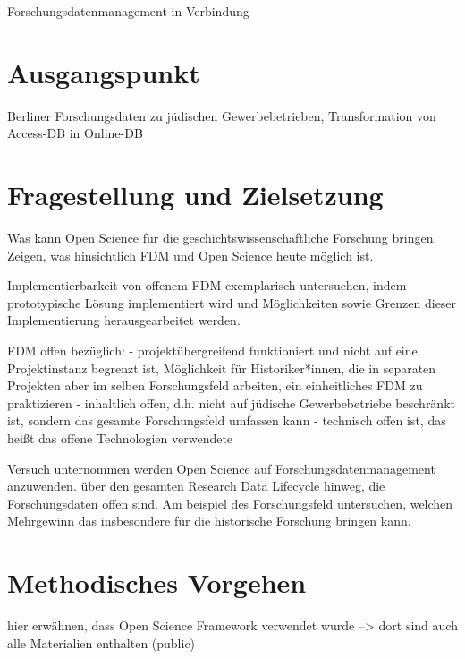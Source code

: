 \onehalfspacing

Forschungsdatenmanagement in Verbindung

\section{Ausgangspunkt}

Berliner Forschungsdaten zu jüdischen Gewerbebetrieben, Transformation von Access-DB in Online-DB

\section{Fragestellung und Zielsetzung}

Was kann Open Science für die geschichtswissenschaftliche Forschung bringen. 
Zeigen, was hinsichtlich FDM und Open Science heute möglich ist.

Implementierbarkeit von offenem FDM exemplarisch untersuchen, indem prototypische Lösung implementiert wird und Möglichkeiten sowie Grenzen dieser Implementierung herausgearbeitet werden.   

FDM offen bezüglich:
- projektübergreifend funktioniert und nicht auf eine Projektinstanz begrenzt ist, Möglichkeit für Historiker*innen, die in separaten Projekten aber im selben Forschungsfeld arbeiten, ein einheitliches FDM zu praktizieren
- inhaltlich offen, d.h. nicht auf jüdische Gewerbebetriebe beschränkt ist, sondern das gesamte Forschungsfeld umfassen kann
- technisch offen ist, das heißt das offene Technologien verwendete

Versuch unternommen werden Open Science auf Forschungsdatenmanagement anzuwenden. über den gesamten Research Data Lifecycle hinweg, die Forschungsdaten offen sind. Am beispiel des Forschungsfeld untersuchen, welchen Mehrgewinn das insbesondere für die historische Forschung bringen kann. 

\section{Methodisches Vorgehen}

hier erwähnen, dass Open Science Framework verwendet wurde --> dort sind auch alle Materialien enthalten (public)